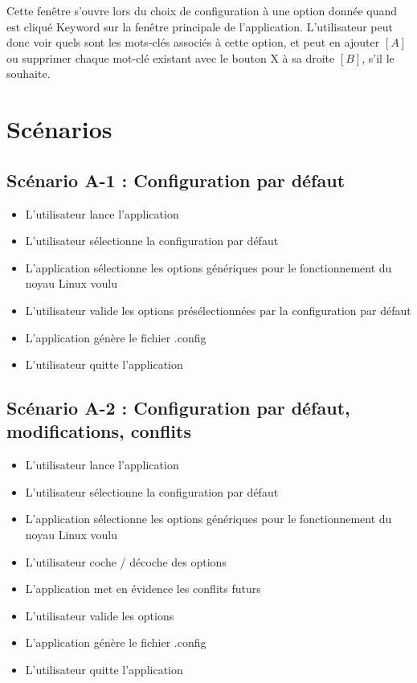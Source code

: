 \documentclass[16pts]{report}
\begin{document}
Cette fenêtre s'ouvre lors du choix de configuration à une option donnée quand
est cliqué Keyword sur la fenêtre principale de l'application.
L'utilisateur peut donc voir quels sont les mots-clés associés à cette option,
et peut en ajouter $[A]$ ou supprimer chaque mot-clé existant avec le bouton
X à sa droite $[B]$, s'il le souhaite.


\chapter{Scénarios}
\label{cha:Scénarios}

\section{Scénario A-1 : Configuration par défaut}
\label{sec:Scénario A-1 : Configuration par défaut}

\begin{itemize}
    \item L'utilisateur lance l'application
    \item L'utilisateur sélectionne la configuration par défaut
    \item L'application sélectionne les options génériques pour le
        fonctionnement du noyau Linux voulu
    \item L'utilisateur valide les options présélectionnées par la
        configuration par défaut
    \item L'application génère le fichier .config
    \item L'utilisateur quitte l'application
\end{itemize}


\section{Scénario A-2 : Configuration par défaut, modifications, conflits}
\label{sec:Scénario A-2 : Configuration par défaut, modifications, conflits}

\begin{itemize}
    \item L'utilisateur lance l'application
    \item L'utilisateur sélectionne la configuration par défaut
    \item L'application sélectionne les options génériques pour le
        fonctionnement du noyau Linux voulu
    \item L'utilisateur coche / décoche des options
    \item L'application met en évidence les conflits futurs
    \item L'utilisateur valide les options
    \item L'application génère le fichier .config
    \item L'utilisateur quitte l'application
\end{itemize}
\end{document}
